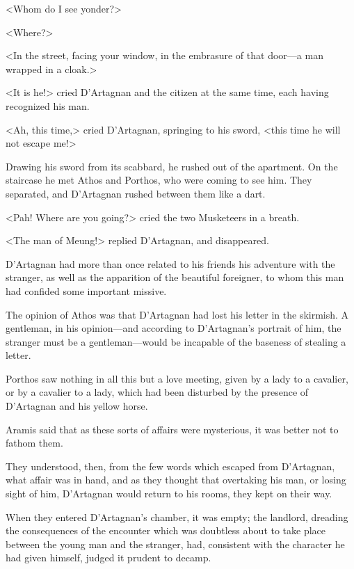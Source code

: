 <Whom do I see yonder?> 

<Where?> 

<In the street, facing your window, in the embrasure of that door—a man wrapped in a cloak.> 

<It is he!> cried D'Artagnan and the citizen at the same time, each having recognized his man. 

<Ah, this time,> cried D'Artagnan, springing to his sword, <this time he will not escape me!> 

Drawing his sword from its scabbard, he rushed out of the apartment. On the staircase he met Athos and Porthos, who were coming to see him. They separated, and D'Artagnan rushed between them like a dart. 

<Pah! Where are you going?> cried the two Musketeers in a breath. 

<The man of Meung!> replied D'Artagnan, and disappeared. 

D'Artagnan had more than once related to his friends his adventure with the stranger, as well as the apparition of the beautiful foreigner, to whom this man had confided some important missive. 

The opinion of Athos was that D'Artagnan had lost his letter in the skirmish. A gentleman, in his opinion—and according to D'Artagnan's portrait of him, the stranger must be a gentleman—would be incapable of the baseness of stealing a letter. 

Porthos saw nothing in all this but a love meeting, given by a lady to a cavalier, or by a cavalier to a lady, which had been disturbed by the presence of D'Artagnan and his yellow horse. 

Aramis said that as these sorts of affairs were mysterious, it was better not to fathom them. 

They understood, then, from the few words which escaped from D'Artagnan, what affair was in hand, and as they thought that overtaking his man, or losing sight of him, D'Artagnan would return to his rooms, they kept on their way. 

When they entered D'Artagnan's chamber, it was empty; the landlord, dreading the consequences of the encounter which was doubtless about to take place between the young man and the stranger, had, consistent with the character he had given himself, judged it prudent to decamp.